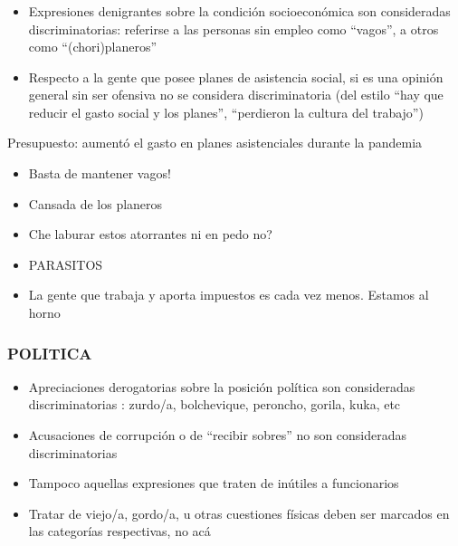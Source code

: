 \subsubsection{}


\begin{itemize}
    \item Expresiones denigrantes sobre la condición socioeconómica son consideradas discriminatorias: referirse a las personas sin empleo como ``vagos'', a otros como ``(chori)planeros''
    \item Respecto a la gente que posee planes de asistencia social, si es una opinión general sin ser ofensiva no se considera discriminatoria (del estilo ``hay que reducir el gasto social y los planes'', ``perdieron la cultura del trabajo'')
\end{itemize}


\begin{displayquote}
    Presupuesto: aumentó el gasto en planes asistenciales durante la pandemia

    \begin{itemize}
        \item Basta de mantener vagos!
        \item Cansada de los planeros
        \item Che laburar estos atorrantes ni en pedo no?
        \item PARASITOS
    \end{itemize}


    \begin{itemize}
        \item La gente que trabaja y aporta impuestos es cada vez menos. Estamos al horno
    \end{itemize}

\end{displayquote}



\subsubsection{POLITICA}

\begin{itemize}
    \item Apreciaciones derogatorias sobre la posición política son consideradas discriminatorias : zurdo/a, bolchevique, peroncho, gorila, kuka, etc
    \item Acusaciones de corrupción o de ``recibir sobres'' no son consideradas discriminatorias
    \item Tampoco aquellas expresiones que traten de inútiles a funcionarios
    \item Tratar de viejo/a, gordo/a, u otras cuestiones físicas deben ser marcados en las categorías respectivas, no acá
\end{itemize}




